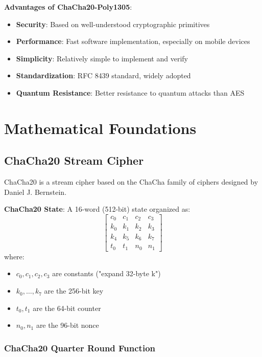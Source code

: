 \documentclass[11pt,a4paper]{article}
\begin{document}
\begin{prosbox}
\textbf{Advantages of ChaCha20-Poly1305}:
\begin{itemize}
    \item \textbf{Security}: Based on well-understood cryptographic primitives
    \item \textbf{Performance}: Fast software implementation, especially on mobile devices
    \item \textbf{Simplicity}: Relatively simple to implement and verify
    \item \textbf{Standardization}: RFC 8439 standard, widely adopted
    \item \textbf{Quantum Resistance}: Better resistance to quantum attacks than AES
\end{itemize}
\end{prosbox}

\section{Mathematical Foundations}

\subsection{ChaCha20 Stream Cipher}

ChaCha20 is a stream cipher based on the ChaCha family of ciphers designed by Daniel J. Bernstein.

\begin{mathbox}
\textbf{ChaCha20 State}: A 16-word (512-bit) state organized as:
\[
\begin{bmatrix}
c_0 & c_1 & c_2 & c_3 \\
k_0 & k_1 & k_2 & k_3 \\
k_4 & k_5 & k_6 & k_7 \\
t_0 & t_1 & n_0 & n_1
\end{bmatrix}
\]
where:
\begin{itemize}
    \item $c_0, c_1, c_2, c_3$ are constants ("expand 32-byte k")
    \item $k_0, \ldots, k_7$ are the 256-bit key
    \item $t_0, t_1$ are the 64-bit counter
    \item $n_0, n_1$ are the 96-bit nonce
\end{itemize}
\end{mathbox}

\subsubsection{ChaCha20 Quarter Round Function}
\end{document}
